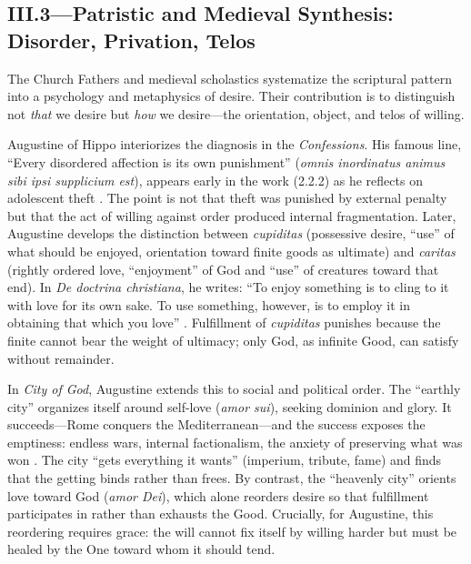 \subsection*{III.3—Patristic and Medieval Synthesis: Disorder, Privation, Telos}
\label{ssec:iii-patristic-medieval}

The Church Fathers and medieval scholastics systematize the scriptural pattern into a
psychology and metaphysics of desire. Their contribution is to distinguish not \emph{that} we
desire but \emph{how} we desire---the orientation, object, and telos of willing.

Augustine of Hippo interiorizes the diagnosis in the \emph{Confessions}. His famous line,
``Every disordered affection is its own punishment'' (\emph{omnis inordinatus animus sibi ipsi
	supplicium est}), appears early in the work (2.2.2) as he reflects on adolescent theft
\parencite[p.~47]{AugustineConfessions1998}. The point is not that theft was punished by
external penalty but that the act of willing against order produced internal fragmentation.
Later, Augustine develops the distinction between \emph{cupiditas} (possessive desire, ``use''
of what should be enjoyed, orientation toward finite goods as ultimate) and \emph{caritas}
(rightly ordered love, ``enjoyment'' of God and ``use'' of creatures toward that end). In
\emph{De doctrina christiana}, he writes: ``To enjoy something is to cling to it with love for
its own sake. To use something, however, is to employ it in obtaining that which you love''
\parencite{AugustineDeDoctrina1958}. Fulfillment of \emph{cupiditas} punishes because the
finite cannot bear the weight of ultimacy; only God, as infinite Good, can satisfy without
remainder.

In \emph{City of God}, Augustine extends this to social and political order. The ``earthly
city'' organizes itself around self-love (\emph{amor sui}), seeking dominion and glory. It
succeeds---Rome conquers the Mediterranean---and the success exposes the emptiness: endless
wars, internal factionalism, the anxiety of preserving what was won
\parencite{AugustineCity2003}. The city ``gets everything it wants'' (imperium, tribute,
fame) and finds that the getting binds rather than frees. By contrast, the ``heavenly city''
orients love toward God (\emph{amor Dei}), which alone reorders desire so that fulfillment
participates in rather than exhausts the Good. Crucially, for Augustine, this reordering
requires grace: the will cannot fix itself by willing harder but must be healed by the One
toward whom it should tend.

